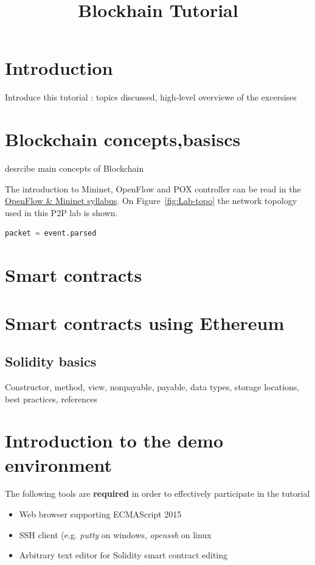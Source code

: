 \documentclass[a4paper]{article}
\title{Blockhain Tutorial}
\author{}
\date{}
\begin{document}
\maketitle

\tableofcontents

\section{Introduction}

Introduce this tutorial : topics discussed, high-level overviewe of the excersises

\section{Blockchain concepts,basiscs}

desrcibe main concepts of Blockchain 

The introduction to Mininet, OpenFlow and POX controller can be read in the
\href{https://qosip.tmit.bme.hu/foswiki/pub/Meres/OpenFlowMSc/OpenFlow-Mininet-syllabus-en.pdf}{OpenFlow \& Mininet
    syllabus}. On
Figure~\ref{fig:Lab-topo} the network topology used in this P2P lab is shown.


\begin{lstlisting}[language=python,frame=single,breaklines]
packet = event.parsed  
\end{lstlisting}


\section{Smart contracts}


\section{Smart contracts using Ethereum}

\subsection{Solidity basics}

Constructor, method, view, nonpayable, payable, data types, storage locations, best practices, references

\section{Introduction to the demo environment}

The following tools are \textbf{required} in order to effectively participate in the tutorial
\begin{itemize}
    \item Web browser supporting ECMAScript 2015
    \item SSH client (e.g. \emph{putty} on windows, \emph{openssh} on linux
    \item Arbitrary text editor for Solidity smart contract editing
\end{itemize}{}
\end{document}
